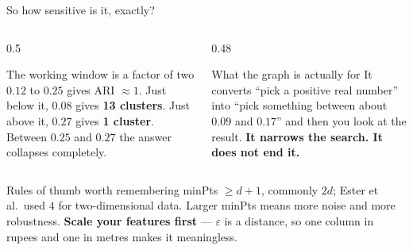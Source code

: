 \documentclass[aspectratio=169]{beamer}
\begin{document}
\begin{frame}[shrink=8]{So how sensitive is it, exactly?}
  \begin{columns}[T]
    \begin{column}{0.5\textwidth}
      \begin{alertblock}{The working window is a factor of two}
        \small $0.12$ to $0.25$ gives ARI $\approx 1$. Just below it,
        $0.08$ gives \textbf{13 clusters}. Just above it, $0.27$ gives
        \textbf{1 cluster}. Between $0.25$ and $0.27$ the answer collapses
        completely.
      \end{alertblock}
    \end{column}
    \begin{column}{0.48\textwidth}
      \begin{block}{What the graph is actually for}
        \small It converts ``pick a positive real number'' into ``pick
        something between about $0.09$ and $0.17$'' and then you look at the
        result. \textbf{It narrows the search. It does not end it.}
      \end{block}
    \end{column}
  \end{columns}
  \vspace{0.3em}
  \begin{exampleblock}{Rules of thumb worth remembering}
    \small
    minPts $\ge d+1$, commonly $2d$; Ester et al.\ used $4$ for
    two-dimensional data. Larger minPts means more noise and more robustness.
    \textbf{Scale your features first} --- $\varepsilon$ is a distance, so
    one column in rupees and one in metres makes it meaningless.
  \end{exampleblock}
\end{frame}
\end{document}
